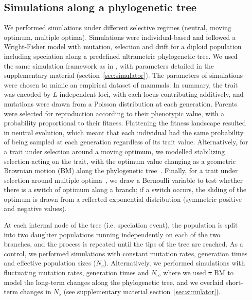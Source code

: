 \documentclass{article}
\makeatletter
\newcommand{\Ne}{N_{\text{e}}}
\newcommand{\NbrLoci}{L}
\providecommand{\DIFdeltex}[1]{{\protect\color{red}\sout{#1}}} %
\providecommand{\DIFdelbegin}{} %
\providecommand{\DIFdelend}{} %
\providecommand{\DIFdel}[1]{\texorpdfstring{\DIFdeltex{#1}}{}} %
\newcommand{\DIFscaledelfig}{0.5}
\newlength{\DIFdelgraphicswidth} %
\newlength{\DIFdelgraphicsheight} %
\newcommand{\DIFdelincludegraphics}[2][]{%
\sbox{\DIFdelgraphicsbox}{\DIFOincludegraphics[#1]{#2}}%
\settoboxwidth{\DIFdelgraphicswidth}{\DIFdelgraphicsbox} %
\settoboxtotalheight{\DIFdelgraphicsheight}{\DIFdelgraphicsbox} %
\scalebox{\DIFscaledelfig}{%
\parbox[b]{\DIFdelgraphicswidth}{\usebox{\DIFdelgraphicsbox}\\[-\baselineskip] \rule{\DIFdelgraphicswidth}{0em}}\llap{\resizebox{\DIFdelgraphicswidth}{\DIFdelgraphicsheight}{%
\setlength{\unitlength}{\DIFdelgraphicswidth}%
\begin{picture}(1,1)%
\thicklines\linethickness{2pt} %
{\color[rgb]{1,0,0}\put(0,0){\framebox(1,1){}}}%
{\color[rgb]{1,0,0}\put(0,0){\line( 1,1){1}}}%
{\color[rgb]{1,0,0}\put(0,1){\line(1,-1){1}}}%
\end{picture}%
}\hspace*{3pt}}} %
} %
\DeclareRobustCommand{\DIFdelbegin}{\DIFOdelbegin \let\includegraphics\DIFdelincludegraphics} %
\DeclareRobustCommand{\DIFdelend}{\DIFOaddend \let\includegraphics\DIFOincludegraphics} %
\let\sout@orig\sout %
\renewcommand{\sout}[1]{\ifmmode\text{\sout@orig{\ensuremath{#1}}}\else\sout@orig{#1}\fi} %
\makeatother
\begin{document}
\subsection*{Simulations along a phylogenetic tree}
We performed simulations under different selective regimes (neutral, moving optimum, multiple optima).
Simulations were individual-based and followed a Wright-Fisher model with mutation, selection and drift for a diploid population including speciation along a predefined ultrametric phylogenetic tree.
We used the same simulation framework as in \citet{latrille_detecting_2024}, with parameters detailed in the supplementary material (section~\ref{sec:simulator}).
The parameters of simulations were chosen to mimic an empirical dataset of mammals.
In summary, the trait was encoded by $\NbrLoci$ independent loci, with each locus contributing additively, and mutations were drawn from a Poisson distribution at each generation.
Parents were selected for reproduction according to their phenotypic value, with a probability proportional to their fitness.
Flattening the fitness landscape resulted in neutral evolution, which meant that each individual had the same probability of being sampled at each generation regardless of its trait value.
Alternatively, for a trait under selection around a moving optimum, we modelled stabilizing selection acting on the trait, with the optimum value changing as a geometric Brownian motion (BM) along the phylogenetic tree~\citep{hansen_stabilizing_1997, hansen_translating_1996}.
Finally, for a trait under selection around multiple optima~\citep{uyeda_novel_2014}, we draw a Bernoulli variable to test whether there is a switch of optimum along a branch; if a switch occurs, the sliding of the optimum is drawn from a reflected exponential distribution (symmetric positive and negative values).

At each internal node of the tree (i.e. speciation event), the population is split into two daughter populations running independently on each of the two branches, and the process is repeated until the tips of the tree are reached.
As a control, we performed simulations with constant mutation rates, generation times and effective population sizes ($\Ne$).
Alternatively, we performed simulations with fluctuating mutation rates, generation times and $\Ne$, where we used \DIFdelbegin \DIFdel{a }\DIFdelend BM to model the long-term changes along the phylogenetic tree, and we overlaid short-term changes in $\Ne$ (see supplementary material section~\ref{sec:simulator}).
\end{document}
